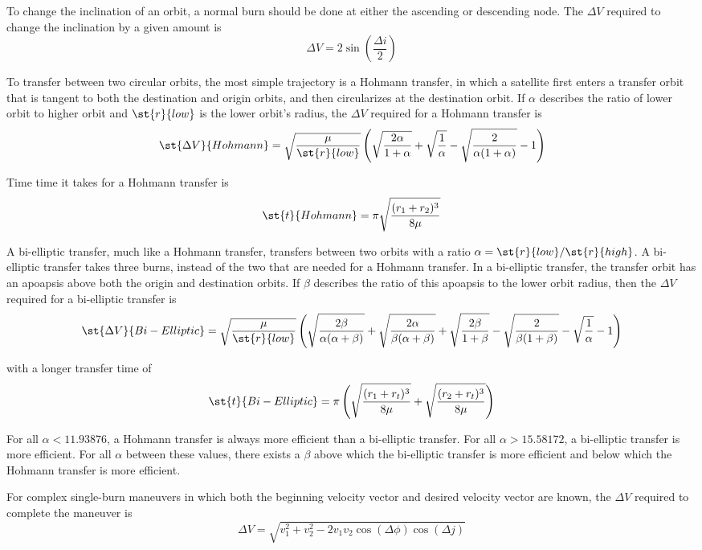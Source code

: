 \documentclass[../basicOrbitalDynamics.tex]{subfiles}
\begin{document}
\bigskip
To change the inclination of an orbit, a normal burn should be done at either the ascending or descending node. The $\Delta V$ required to change the inclination by a given amount is
$$\Delta V=2\sin\left(\frac{\Delta i}{2}\right)$$

\bigskip
To transfer between two circular orbits, the most simple trajectory is a Hohmann transfer, in which a satellite first enters a transfer orbit that is tangent to both the destination and origin orbits, and then circularizes at the destination orbit. If $\alpha$ describes the ratio of lower orbit to higher orbit and $\st{r}{low}$ is the lower orbit's radius, the $\Delta V$ required for a Hohmann transfer is
$$\st{\Delta V}{Hohmann} = \sqrt{\frac{\mu}{\st{r}{low}}}\left(\sqrt{\frac{2\alpha}{1+\alpha}}+\sqrt{\frac{1}{\alpha}}-\sqrt{\frac{2}{\alpha(1+\alpha)}}-1\right)$$

Time time it takes for a Hohmann transfer is
$$\st{t}{Hohmann}=\pi\sqrt{\frac{(r_1+r_2)^3}{8\mu}}$$

\bigskip
A bi-elliptic transfer, much like a Hohmann transfer, transfers between two orbits with a ratio $\alpha=\st{r}{low}/\st{r}{high}$. A bi-elliptic transfer takes three burns, instead of the two that are needed for a Hohmann transfer. In a bi-elliptic transfer, the transfer orbit has an apoapsis above both the origin and destination orbits. If $\beta$ describes the ratio of this apoapsis to the lower orbit radius, then the $\Delta V$ required for a bi-elliptic transfer is
$$\st{\Delta V}{Bi-Elliptic} = \sqrt{\frac{\mu}{\st{r}{low}}}\left(\sqrt{\frac{2\beta}{\alpha(\alpha+\beta)}}+\sqrt{\frac{2\alpha}{\beta(\alpha+\beta)}}+\sqrt{\frac{2\beta}{1+\beta}}-\sqrt{\frac{2}{\beta(1+\beta)}}-\sqrt{\frac{1}{\alpha}}-1\right)$$

with a longer transfer time of
$$\st{t}{Bi-Elliptic}=\pi\left(\sqrt{\frac{(r_1+r_t)^3}{8\mu}}+\sqrt{\frac{(r_2+r_t)^3}{8\mu}}\right)$$

For all $\alpha<11.93876$, a Hohmann transfer is always more efficient than a bi-elliptic transfer. For all $\alpha>15.58172$, a bi-elliptic transfer is more efficient. For all $\alpha$ between these values, there exists a $\beta$ above which the bi-elliptic transfer is more efficient and below which the Hohmann transfer is more efficient.

\bigskip

For complex single-burn maneuvers in which both the beginning velocity vector and desired velocity vector are known, the $\Delta V$ required to complete the maneuver is
$$\Delta V = \sqrt{v_1^2+v_2^2-2v_1v_2\cos(\Delta \phi)\cos(\Delta j)}$$
\end{document}
